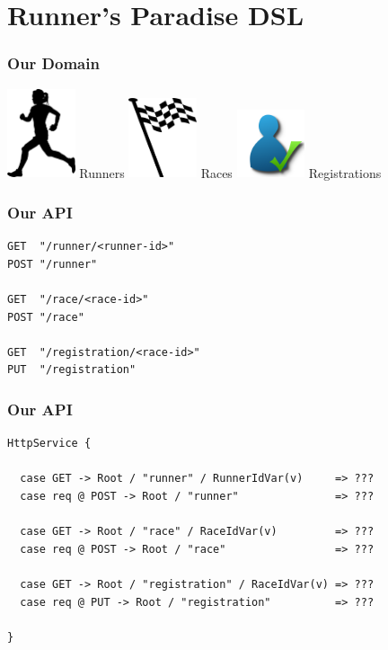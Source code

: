 \documentclass{beamer}
\begin{document}
\section{Runner's Paradise DSL}

\begin{frame}
  \frametitle{Our Domain}
  \begin{center}
    \huge
    \includegraphics[width=2cm]{../pics/runner.png}
    Runners
    \includegraphics[width=2cm]{../pics/race.png}
    Races
    \includegraphics[width=2cm]{../pics/registration.png}
    Registrations
  \end{center}
\end{frame}

\begin{frame}[fragile]
  \frametitle{Our API}
\begin{verbatim}
GET  "/runner/<runner-id>"
POST "/runner"

GET  "/race/<race-id>"
POST "/race"

GET  "/registration/<race-id>"
PUT  "/registration"
\end{verbatim}
\end{frame}

\begin{frame}[fragile]
  \frametitle{Our API}
\begin{verbatim}
HttpService {

  case GET -> Root / "runner" / RunnerIdVar(v)     => ???
  case req @ POST -> Root / "runner"               => ???

  case GET -> Root / "race" / RaceIdVar(v)         => ???
  case req @ POST -> Root / "race"                 => ???

  case GET -> Root / "registration" / RaceIdVar(v) => ???
  case req @ PUT -> Root / "registration"          => ???

}
\end{verbatim}
\end{frame}
\end{document}
